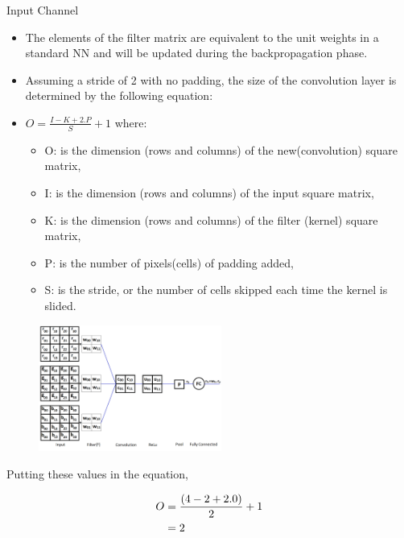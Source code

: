 \begin{vbframe}{Input Channel}
    \begin{itemize}
       \item The elements of the filter matrix are equivalent to the unit weights in a standard NN and will be updated during the backpropagation phase.
       \item Assuming a stride of 2 with no padding, the size of the convolution layer is determined by the following equation:
       \item $ O = \frac{I - K + 2.P}{S} + 1$ where: 
    \begin{itemize}
       \item O: is the dimension (rows and columns) of the new(convolution) square matrix, 
       \item I: is the dimension (rows and columns) of the input square matrix,
       \item K: is the dimension (rows and columns) of the filter (kernel) square matrix, 
       \item P: is the number of pixels(cells) of padding added,
       \item S: is the stride, or the number of cells skipped each time the kernel is slided.
    \end{itemize}
    \end{itemize}

 \begin{figure}
    \centering
    \includegraphics[width=6cm]{figure/cnn-net.png}
  \end{figure}

Putting these values in the equation,

\begin{align} 
O&={(4 - 2 + 2.0)\over 2} + 1\\ 
&=2 
\end{align}

\end{vbframe}



\endlecture
